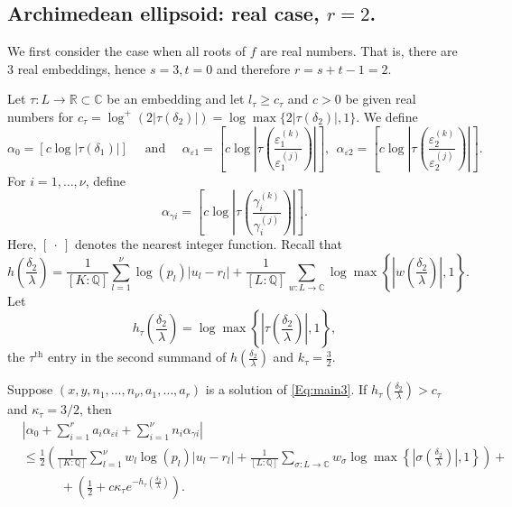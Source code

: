 \subsection{Archimedean ellipsoid: real case, $r = 2$.}
We first consider the case when all roots of $f$ are real numbers. That is, there are $3$ real embeddings, hence $s=3, t = 0$ and therefore $r = s+t-1 = 2$. 

Let $\tau:L\to\mathbb{R} \subset \mathbb{C}$ be an embedding and let $l_\tau\geq c_\tau$ and $c>0$ be given real numbers for $c_\tau=\log^+(2|\tau(\delta_2)|)= \log \max\{2|\tau(\delta_2)|,1\}$. We define 
\[\alpha_0 = [c\log|\tau(\delta_1)|] \quad \text{ and } \quad \alpha_{\varepsilon 1} =  \left[c\log\left|\tau\left(\frac{\varepsilon_1^{(k)}}{\varepsilon_1^{(j)}}\right)\right|\right],\ \  \alpha_{\varepsilon 2} =  \left[c\log\left|\tau\left(\frac{\varepsilon_2^{(k)}}{\varepsilon_2^{(j)}}\right)\right|\right].\]
For $i = 1, \dots, \nu$, define
\[\alpha_{\gamma i} = \left[c\log\left|\tau\left(\frac{\gamma_i^{(k)}}{\gamma_i^{(j)}}\right)\right|\right].\]
Here, $[ \ \cdot\  ]$ denotes the nearest integer function. 
Recall that
\[h\left(\frac{\delta_2}{\lambda}\right) = \frac{1}{[K:\mathbb{Q}]}\sum_{l = 1}^{\nu} \log(p_l)|u_l - r_l| + \frac{1}{[L:\mathbb{Q}]}\sum_{w :L \to \mathbb{C}} \log \max \left\{ \left|w\left(\frac{\delta_2}{\lambda}\right)\right|, 1\right\}.\]
Let 
\[h_{\tau}\left(\frac{\delta_2}{\lambda}\right) =\log \max \left\{ \left|\tau\left(\frac{\delta_2}{\lambda}\right)\right|, 1\right\},\]
the $\tau^{\text{th}}$ entry in the second summand of $h\left(\frac{\delta_2}{\lambda}\right)$ and $k_{\tau} = \frac{3}{2}.$

\begin{lemma}\label{lem:archellest}
Suppose $(x,y, n_1, \dots, n_{\nu}, a_1, \dots, a_r)$ is a solution of \eqref{Eq:main3}. If ${h_{\tau} \left(\frac{\delta_2}{\lambda}\right) > c_{\tau}}$ and $\kappa_\tau=3/2$, then  
\begin{align*}
&\left|\alpha_0+\sum_{i = 1}^r a_i \alpha_{\varepsilon i} + \sum_{i = 1}^{\nu} n_i \alpha_{\gamma i}\right|\\
	& \leq \frac{1}{2}\left(\frac{1}{[K:\mathbb{Q}]}\sum_{l = 1}^{\nu}w_l \log(p_l)|u_l - r_l| + \frac{1}{[L:\mathbb{Q}]}\sum_{\sigma :L \to \mathbb{C}} w_{\sigma}\log \max \left\{ \left|\sigma\left(\frac{\delta_2}{\lambda}\right)\right|, 1\right\} \right) + \\
	& \quad \quad \quad + \left(\frac{1}{2} + c\kappa_{\tau}e^{-h_{\tau}\left(\frac{\delta_2}{\lambda}\right)}\right).
\end{align*} 
\end{lemma}

